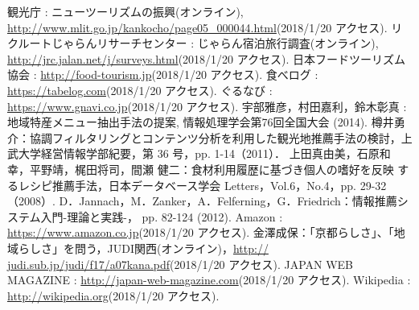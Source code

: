 \documentclass{funthesis}
\begin{document}
\begin{thebibliography}{99}
 観光庁 : ニューツーリズムの振興(オンライン), \url{http://www.mlit.go.jp/kankocho/page05_000044.html}(2018/1/20 アクセス).
 リクルートじゃらんリサーチセンター : じゃらん宿泊旅行調査(オンライン), \url{http://jrc.jalan.net/j/surveys.html}(2018/1/20 アクセス).
 日本フードツーリズム協会 : \url{http://food-tourism.jp}(2018/1/20 アクセス).
 食べログ : \url{https://tabelog.com}(2018/1/20 アクセス).
 ぐるなび : \url{https://www.gnavi.co.jp}(2018/1/20 アクセス).
 宇部雅彦，村田嘉利，鈴木彰真 : 地域特産メニュー抽出手法の提案, 情報処理学会第76回全国大会 (2014).
 樽井勇介：協調フィルタリングとコンテンツ分析を利用した観光地推薦手法の検討，上武大学経営情報学部紀要，第 36 号，pp. 1-14（2011）．
 上田真由美，石原和幸，平野靖，梶田将司，間瀬 健二：食材利用履歴に基づき個人の嗜好を反映 するレシピ推薦手法，日本データベース学会 Letters，Vol.6，No.4，pp. 29-32（2008）.
 D．Jannach，M．Zanker，A．Felferning，G．Friedrich：情報推薦システム入門-理論と実践-， pp. 82-124 (2012).
 Amazon : \url{https://www.amazon.co.jp}(2018/1/20 アクセス).
 金澤成保：「京都らしさ」、「地域らしさ」を問う，JUDI関西(オンライン)，\url{http:// judi.sub.jp/judi/f17/a07kana.pdf}(2018/1/20 アクセス).
 JAPAN WEB MAGAZINE : \url{http://japan-web-magazine.com}(2018/1/20 アクセス).
 Wikipedia : \url{http://wikipedia.org}(2018/1/20 アクセス).
\end{thebibliography}

\listoftables

\listoffigures
\end{document}

